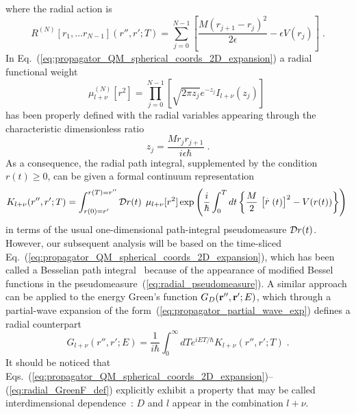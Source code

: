 \documentclass[a4paper,preprint,draft,showpacs,amsmath,amsfonts,amssymb,aps,prd]{revtex4}%
\begin{document}
where the radial action is
\begin{equation}
R^{(N)}  
 \left[ 
 r_{1},
\dots
 r_{N-1}
\right]  (r'', r' ; T)  
=
\sum_{j=0}^{N-1}
\left[
\frac{  M
\left( r_{j+1}
- r_{j}  \right)^{2}  
}{2\epsilon} 
-
\epsilon V( r_{j} )
\right]
\; .
\end{equation}
In Eq.~(\ref{eq:propagator_QM_spherical_coords_2D_expansion})
a radial functional weight 
\begin{equation}
\mu_{l+\nu}^{(N)} [r^{2}]
=
\prod_{j=0}^{N-1} 
\left[ 
\sqrt{2 \pi z_{j}} e^{-z_{j}}
I_{l+\nu} (z_{j})
\right]
\; 
\label{eq:radial_pseudomeasure} 
\end{equation}
has been properly
defined with the radial variables appearing through the characteristic 
dimensionless ratio
\begin{equation}
z_{j}
=
 \frac{M r_{j} r_{j+1}}{ i \epsilon \hbar}
\;  .
\label{eq:z_variable}
\end{equation}
As a consequence, 
the radial path integral, supplemented by the condition $r(t) \geq 0$,
can be given a formal continuum representation
\begin{equation}
K_{l+\nu}(r'',r';T)
=
\int_{ r(0) = r'}^{ r(T)=r'' }
{\cal D}  r(t)  \,
\; 
\mu_{l+ \nu} [r^{2}]
\exp \left(
\frac{i}{\hbar} 
\int_{0}^{T}
dt
\left\{
\frac{M}{2} \, \left[   \stackrel{.}{r}  (t) \right]^{2}
-
V(r(t))
\right\}
\right)
\;   
\label{eq:propagator_QM_spherical_coords_2D_expansion_continuous}
\end{equation}
in terms of the usual one-dimensional path-integral pseudomeasure 
${\cal D}  r(t)  $.
However, our subsequent analysis will be based on the time-sliced
Eq.~(\ref{eq:propagator_QM_spherical_coords_2D_expansion}),
which has been called a Besselian path integral~\cite{gro:98} because of the appearance of
modified Bessel functions in the pseudomeasure~(\ref{eq:radial_pseudomeasure}).
A similar approach can be applied to the energy Green's function
$G_{D} ({\bf r}'', {\bf r}' ; E) $,
which through a partial-wave expansion of the form~(\ref{eq:propagator_partial_wave_exp})
defines a radial counterpart
\begin{equation}
G_{l +\nu}(r'',r';E)
 = 
\frac{1}{ i\hbar }
\int_{0}^{\infty} dT  
e^{iET/\hbar}
K_{l +\nu}(r'',r';T)
\; .
\label{eq:radial_GreenF_def}
\end{equation}
It should be noticed that
Eqs.~(\ref{eq:propagator_QM_spherical_coords_2D_expansion})--(\ref{eq:radial_GreenF_def})
explicitly exhibit  a property that may be called interdimensional 
dependence~\cite{interdimensional}:
$D$ and $l$ appear in the combination $l+\nu$.
\end{document}
